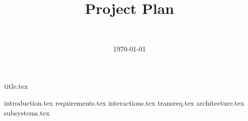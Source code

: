 \documentclass[final]{report}
\title{Project Plan}
\author{~}
\date{\today}
\begin{document}

{title.tex}
\newpage
\tableofcontents

\newpage
{}
{introduction.tex}
{requirements.tex}
{interactions.tex}
{transreq.tex}
{architecture.tex}
{subsystems.tex}
\newpage
{}

\end{document}
